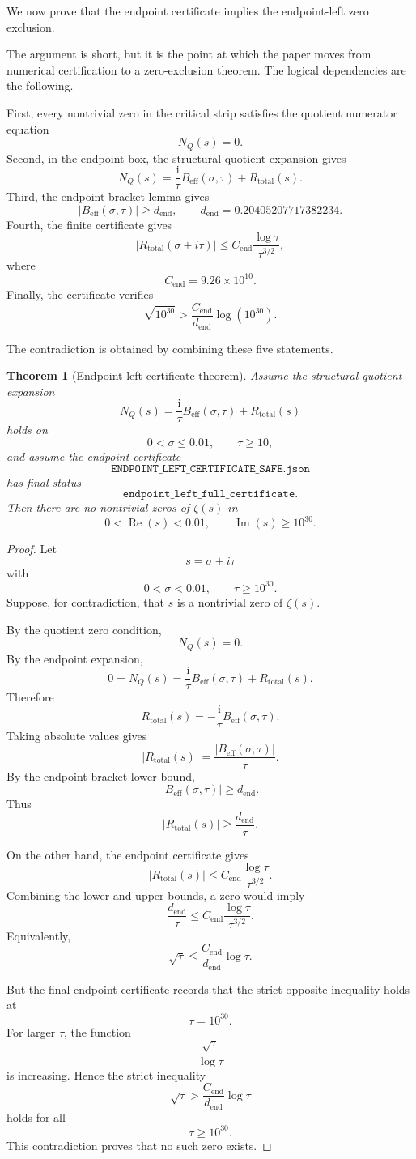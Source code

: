 \documentclass[11pt]{article}
\newtheorem{theorem}{Theorem}[section]
\DeclareMathOperator{\Rea}{Re}
\DeclareMathOperator{\Ima}{Im}
\newcommand{\NQ}{N_Q}
\newcommand{\Beff}{B_{\mathrm{eff}}}
\newcommand{\Rtot}{R_{\mathrm{total}}}
\newcommand{\Cend}{C_{\mathrm{end}}}
\newcommand{\dend}{d_{\mathrm{end}}}
\newcommand{\ii}{\mathrm{i}}
\begin{document}
We now prove that the endpoint certificate implies the endpoint-left zero exclusion.

The argument is short, but it is the point at which the paper moves from numerical certification to a zero-exclusion theorem. The logical dependencies are the following.

First, every nontrivial zero in the critical strip satisfies the quotient numerator equation
\[
\NQ(s)=0.
\]
Second, in the endpoint box, the structural quotient expansion gives
\[
\NQ(s)=\frac{\ii}{\tau}\Beff(\sigma,\tau)+\Rtot(s).
\]
Third, the endpoint bracket lemma gives
\[
|\Beff(\sigma,\tau)|\geq \dend,
\qquad
\dend=0.20405207717382234.
\]
Fourth, the finite certificate gives
\[
|\Rtot(\sigma+i\tau)|
\leq
\Cend\frac{\log\tau}{\tau^{3/2}},
\]
where
\[
\Cend
=
9.26\times10^{10}.
\]
Finally, the certificate verifies
\[
\sqrt{10^{30}}>
\frac{\Cend}{\dend}\log(10^{30}).
\]

The contradiction is obtained by combining these five statements.

\begin{theorem}[Endpoint-left certificate theorem]
Assume the structural quotient expansion
\[
\NQ(s)=\frac{\ii}{\tau}\Beff(\sigma,\tau)+\Rtot(s)
\]
holds on
\[
0< \sigma\leq 0.01,
\qquad
\tau\geq 10,
\]
and assume the endpoint certificate
\[
\texttt{ENDPOINT\_LEFT\_CERTIFICATE\_SAFE.json}
\]
has final status
\[
\texttt{endpoint\_left\_full\_certificate}.
\]
Then there are no nontrivial zeros of \(\zeta(s)\) in
\[
0<\Rea(s)<0.01,
\qquad
\Ima(s)\geq 10^{30}.
\]
\end{theorem}

\begin{proof}
Let
\[
s=\sigma+i\tau
\]
with
\[
0<\sigma<0.01,
\qquad
\tau\geq10^{30}.
\]
Suppose, for contradiction, that \(s\) is a nontrivial zero of \(\zeta(s)\).

By the quotient zero condition,
\[
\NQ(s)=0.
\]
By the endpoint expansion,
\[
0
=
\NQ(s)
=
\frac{\ii}{\tau}\Beff(\sigma,\tau)+\Rtot(s).
\]
Therefore
\[
\Rtot(s)
=
-\frac{\ii}{\tau}\Beff(\sigma,\tau).
\]
Taking absolute values gives
\[
|\Rtot(s)|
=
\frac{|\Beff(\sigma,\tau)|}{\tau}.
\]
By the endpoint bracket lower bound,
\[
|\Beff(\sigma,\tau)|\geq \dend.
\]
Thus
\[
|\Rtot(s)|\geq \frac{\dend}{\tau}.
\]

On the other hand, the endpoint certificate gives
\[
|\Rtot(s)|
\leq
\Cend\frac{\log\tau}{\tau^{3/2}}.
\]
Combining the lower and upper bounds, a zero would imply
\[
\frac{\dend}{\tau}
\leq
\Cend\frac{\log\tau}{\tau^{3/2}}.
\]
Equivalently,
\[
\sqrt{\tau}
\leq
\frac{\Cend}{\dend}\log\tau.
\]


But the final endpoint certificate records that the strict opposite inequality holds at
\[
\tau=10^{30}.
\]
For larger \(\tau\), the function
\[
\frac{\sqrt{\tau}}{\log\tau}
\]
is increasing. Hence the strict inequality
\[
\sqrt{\tau}>
\frac{\Cend}{\dend}\log\tau
\]
holds for all
\[
\tau\geq 10^{30}.
\]
This contradiction proves that no such zero exists.
\end{proof}
\end{document}
